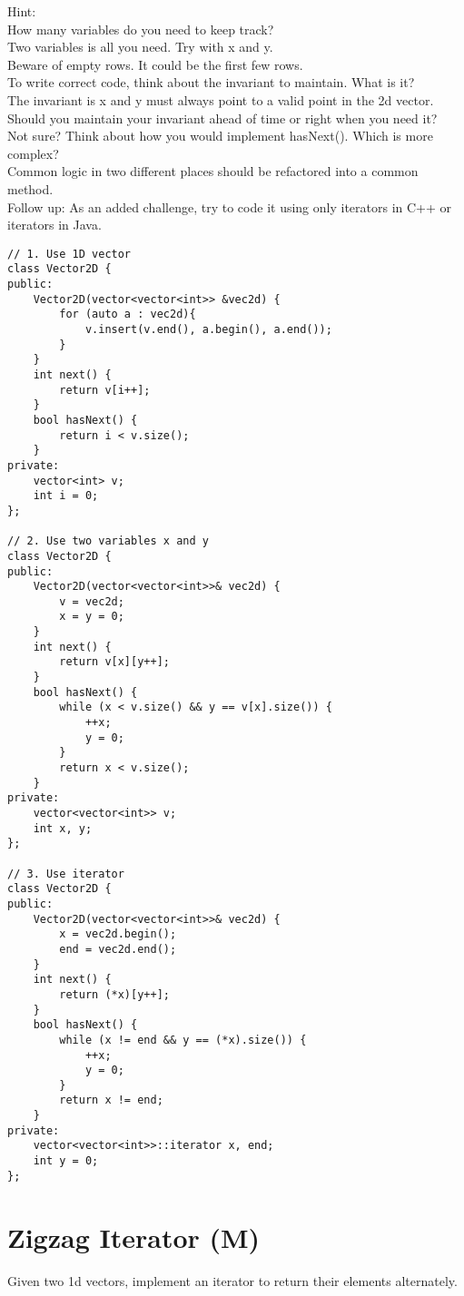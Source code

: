 Hint:\\
    How many variables do you need to keep track?\\
    Two variables is all you need. Try with x and y.\\
    Beware of empty rows. It could be the first few rows.\\
    To write correct code, think about the invariant to maintain. What is it?\\
    The invariant is x and y must always point to a valid point in the 2d vector. Should you maintain your invariant ahead of time or right when you need it?\\
    Not sure? Think about how you would implement hasNext(). Which is more complex?\\
    Common logic in two different places should be refactored into a common method.\\

Follow up: As an added challenge, try to code it using only iterators in C++ or iterators in Java.\\

\begin{lstlisting}
// 1. Use 1D vector
class Vector2D {
public:
    Vector2D(vector<vector<int>> &vec2d) {
        for (auto a : vec2d){
            v.insert(v.end(), a.begin(), a.end());
        }
    }
    int next() {
        return v[i++];
    }
    bool hasNext() {
        return i < v.size();
    }
private:
    vector<int> v;
    int i = 0;
};

// 2. Use two variables x and y
class Vector2D {
public:
    Vector2D(vector<vector<int>>& vec2d) {
        v = vec2d;
        x = y = 0;
    }
    int next() {
        return v[x][y++];
    }
    bool hasNext() {
        while (x < v.size() && y == v[x].size()) {
            ++x; 
            y = 0;
        }
        return x < v.size();
    }    
private:
    vector<vector<int>> v;
    int x, y;
};

// 3. Use iterator
class Vector2D {
public:
    Vector2D(vector<vector<int>>& vec2d) {
        x = vec2d.begin();
        end = vec2d.end();
    }
    int next() {
        return (*x)[y++];
    }
    bool hasNext() {
        while (x != end && y == (*x).size()) {
            ++x; 
            y = 0;
        }
        return x != end;
    }
private:
    vector<vector<int>>::iterator x, end;
    int y = 0;
};
\end{lstlisting}


\section{Zigzag Iterator (M)}
Given two 1d vectors, implement an iterator to return their elements alternately.\\

